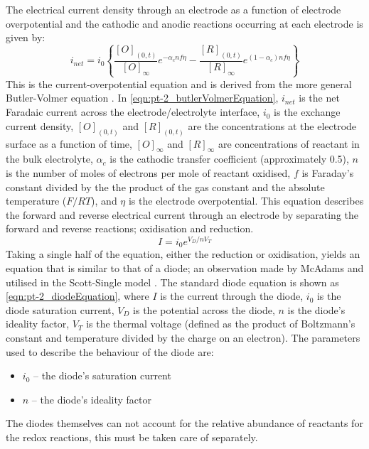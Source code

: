     The electrical current density through an electrode as a function of electrode overpotential and the cathodic and anodic reactions occurring at each electrode is given by:
    \begin{equation}
      i_{net} = i_{0} \left\{ \frac{[O]_{(0,t)}}{[O]_{\infty}}e^{-\alpha_{c}nf\eta} - \frac{[R]_{(0,t)}}{[R]_{\infty}}e^{(1-\alpha_{c})nf\eta}\right\}
      \label{eqn:pt-2_butlerVolmerEquation}
    \end{equation}
    This is the current-overpotential equation and is derived from the more general Butler-Volmer equation \cite{Merrill2005,ScottSingle2013}.
    In \cref{eqn:pt-2_butlerVolmerEquation}, $i_{net}$ is the net Faradaic current across the electrode/electrolyte interface,
    $i_{0}$ is the exchange current density,
    $[O]_{(0,t)}$ and $[R]_{(0,t)}$ are the concentrations at the electrode surface as a function of time,
    $[O]_{\infty}$ and $[R]_{\infty}$ are concentrations of reactant in the bulk electrolyte,
    $\alpha_{c}$ is the cathodic transfer coefficient (approximately 0.5),
    $n$ is the number of moles of electrons per mole of reactant oxidised,
    $f$ is Faraday's constant divided by the the product of the gas constant and the absolute temperature ($F/RT$),
    and $\eta$ is the electrode overpotential.
    This equation describes the forward and reverse electrical current through an electrode by separating the forward and reverse reactions; oxidisation and reduction.
    \begin{equation}
      I = i_0 e^{V_D / n V_T}
      \label{eqn:pt-2_diodeEquation}
    \end{equation}
    Taking a single half of the equation, either the reduction or oxidisation, yields an equation that is similar to that of a diode; an observation made by McAdams and utilised in the Scott-Single model \cite{McAdams1995}.
    The standard diode equation is shown as \cref{eqn:pt-2_diodeEquation}, where
    $I$ is the current through the diode,
    $i_0$ is the diode saturation current,
    $V_D$ is the potential across the diode,
    $n$ is the diode's ideality factor,
    $V_T$ is the thermal voltage (defined as the product of Boltzmann's constant and temperature divided by the charge on an electron).
    The parameters used to describe the behaviour of the diode are:
    \begin{itemize}
      \item $i_0$ -- the diode's saturation current
      \item $n$ -- the diode's ideality factor
    \end{itemize}
    The diodes themselves can not account for the relative abundance of reactants for the redox reactions, this must be taken care of separately.


